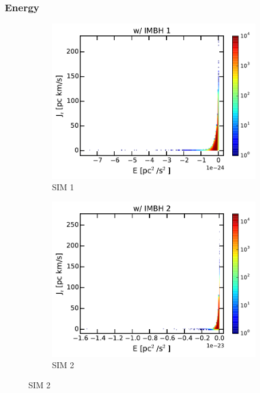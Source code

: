 \subsubsection{Energy}
\begin{figure}[htbp]
\centering
	\begin{subfigure}{0.475\textwidth}
		\includegraphics[width=\textwidth]{Plots/E_J_r_hist_IMBH1.pdf}
		\caption{SIM 1}
		\label{fig:E_J_r_hist_IMBH1}
	\end{subfigure}
	\hfill
	\begin{subfigure}{0.475\textwidth}
		\includegraphics[width=\textwidth]{Plots/E_J_r_hist_IMBH2.pdf}
		\caption{SIM 2}
		\label{fig:E_J_r_hist_IMBH2}
	\end{subfigure}

\end{figure}
